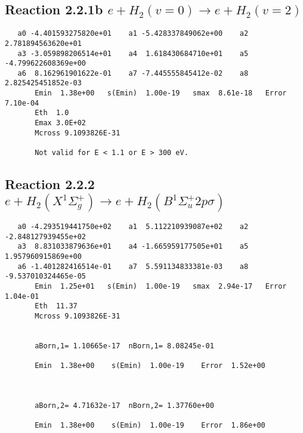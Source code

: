 \documentclass[12pt,dvipdfmx]{article}
\begin{document}
\newpage
\subsection{
Reaction 2.2.1b $   e + H_2(v=0) \rightarrow e + H_2(v=2)$}



\begin{small}\begin{verbatim}
   a0 -4.401593275820e+01    a1 -5.428337849062e+00    a2  2.781894563620e+01
   a3 -3.059898206514e+01    a4  1.618430684710e+01    a5 -4.799622608369e+00
   a6  8.162961901622e-01    a7 -7.445555845412e-02    a8  2.825425451852e-03
       Emin  1.38e+00   s(Emin)  1.00e-19   smax  8.61e-18   Error  7.10e-04
       Eth  1.0
       Emax 3.0E+02
       Mcross 9.1093826E-31

       Not valid for E < 1.1 or E > 300 eV.
\end{verbatim}\end{small}





\newpage
\subsection{
Reaction 2.2.2 $e + H_2(X^1\Sigma_g^+) \rightarrow e + H_2(B^1\Sigma_u^+2p\sigma)$}














\begin{small}\begin{verbatim}
   a0 -4.293519441750e+02    a1  5.112210939087e+02    a2 -2.848127939455e+02
   a3  8.831033879636e+01    a4 -1.665959177505e+01    a5  1.957960915869e+00
   a6 -1.401282416514e-01    a7  5.591134833381e-03    a8 -9.537010324465e-05
       Emin  1.25e+01   s(Emin)  1.00e-19   smax  2.94e-17   Error  1.04e-01
       Eth  11.37
       Mcross 9.1093826E-31


       aBorn,1= 1.10665e-17  nBorn,1= 8.08245e-01

       Emin  1.38e+00    s(Emin)  1.00e-19    Error  1.52e+00



       aBorn,2= 4.71632e-17  nBorn,2= 1.37760e+00

       Emin  1.38e+00    s(Emin)  1.00e-19    Error  1.86e+00
\end{verbatim}\end{small}
\end{document}
